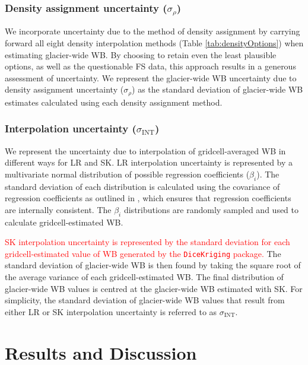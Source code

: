 \documentclass[review,oneside, letterpaper]{igs}
\begin{document}
	\subsubsection{Density assignment uncertainty ($\sigma_{\rho}$)}
We incorporate uncertainty due to the method of density assignment by carrying forward all eight density interpolation methods (Table \ref{tab:densityOptions}) when estimating glacier-wide WB. By choosing to retain even the least plausible options, as well as the questionable FS data, this approach results in a generous assessment of uncertainty. We represent the glacier-wide WB uncertainty due to density assignment uncertainty ($\sigma_{\rho}$) as the standard deviation of glacier-wide WB estimates calculated using each density assignment method.

	\subsubsection{Interpolation uncertainty ($\sigma_{\mathrm{INT}}$)}
We represent the uncertainty due to interpolation of gridcell-averaged WB in different ways for LR and SK. LR interpolation uncertainty is represented by a multivariate normal distribution of possible regression coefficients ($\beta_i$). The standard deviation of each distribution is calculated using the covariance of regression coefficients as outlined in \cite{Bagos2015}, which ensures that regression coefficients are internally consistent. The $\beta_i$ distributions are randomly sampled and used to calculate gridcell-estimated WB.

\textcolor{red}{SK interpolation uncertainty is represented by the standard deviation for each gridcell-estimated value of WB generated by the \texttt{DiceKriging} package. }The standard deviation of glacier-wide WB is then found by taking the square root of the average variance of each gridcell-estimated WB. The final distribution of glacier-wide WB values is centred at the glacier-wide WB estimated with SK. For simplicity, the standard deviation of glacier-wide WB values that result from either LR or SK interpolation uncertainty is referred to as $\sigma_{\mathrm{INT}}$.



\section{Results and Discussion}
\end{document}

